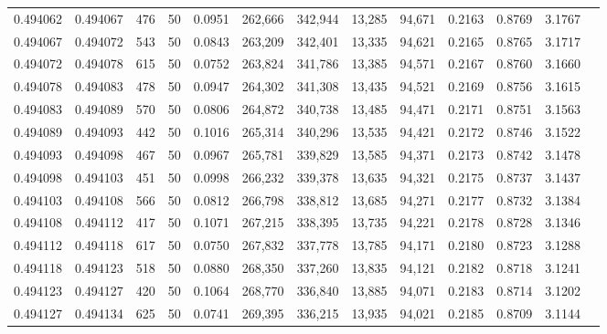 \begin{tabular}{rrrrrrrrrrrrr}
0.494062 & 0.494067 &   476 &  50 &                                     0.0951 & 262,666 & 342,944 &  13,285 &  94,671 & 0.2163 & 0.8769 & 3.1767 \\
0.494067 & 0.494072 &   543 &  50 &                                     0.0843 & 263,209 & 342,401 &  13,335 &  94,621 & 0.2165 & 0.8765 & 3.1717 \\
0.494072 & 0.494078 &   615 &  50 &                                     0.0752 & 263,824 & 341,786 &  13,385 &  94,571 & 0.2167 & 0.8760 & 3.1660 \\
0.494078 & 0.494083 &   478 &  50 &                                     0.0947 & 264,302 & 341,308 &  13,435 &  94,521 & 0.2169 & 0.8756 & 3.1615 \\
0.494083 & 0.494089 &   570 &  50 &                                     0.0806 & 264,872 & 340,738 &  13,485 &  94,471 & 0.2171 & 0.8751 & 3.1563 \\
0.494089 & 0.494093 &   442 &  50 &                                     0.1016 & 265,314 & 340,296 &  13,535 &  94,421 & 0.2172 & 0.8746 & 3.1522 \\
0.494093 & 0.494098 &   467 &  50 &                                     0.0967 & 265,781 & 339,829 &  13,585 &  94,371 & 0.2173 & 0.8742 & 3.1478 \\
0.494098 & 0.494103 &   451 &  50 &                                     0.0998 & 266,232 & 339,378 &  13,635 &  94,321 & 0.2175 & 0.8737 & 3.1437 \\
0.494103 & 0.494108 &   566 &  50 &                                     0.0812 & 266,798 & 338,812 &  13,685 &  94,271 & 0.2177 & 0.8732 & 3.1384 \\
0.494108 & 0.494112 &   417 &  50 &                                     0.1071 & 267,215 & 338,395 &  13,735 &  94,221 & 0.2178 & 0.8728 & 3.1346 \\
0.494112 & 0.494118 &   617 &  50 &                                     0.0750 & 267,832 & 337,778 &  13,785 &  94,171 & 0.2180 & 0.8723 & 3.1288 \\
0.494118 & 0.494123 &   518 &  50 &                                     0.0880 & 268,350 & 337,260 &  13,835 &  94,121 & 0.2182 & 0.8718 & 3.1241 \\
0.494123 & 0.494127 &   420 &  50 &                                     0.1064 & 268,770 & 336,840 &  13,885 &  94,071 & 0.2183 & 0.8714 & 3.1202 \\
0.494127 & 0.494134 &   625 &  50 &                                     0.0741 & 269,395 & 336,215 &  13,935 &  94,021 & 0.2185 & 0.8709 & 3.1144 \\

\end{tabular}

